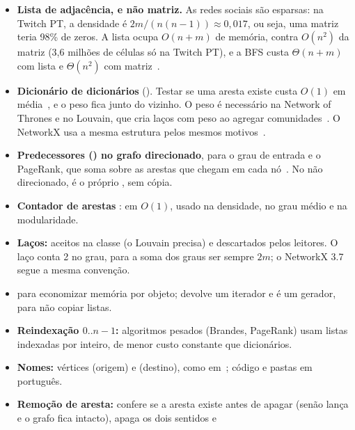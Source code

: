 \begin{itemize}[leftmargin=*]
  \item \textbf{Lista de adjacência, e não matriz.} As redes sociais são esparsas: na Twitch PT,
        a densidade é $2m/(n(n-1)) \approx 0{,}017$, ou seja, uma matriz teria 98\% de zeros.
        A lista ocupa $O(n+m)$ de memória, contra $O(n^2)$ da matriz (3,6 milhões de células só na
        Twitch PT), e a BFS custa $\Theta(n+m)$ com lista e $\Theta(n^2)$ com
        matriz~\cite{cormen2022,sedgewick2011}.
  \item \textbf{Dicionário de dicionários} (). Testar se uma aresta existe
        custa $O(1)$ em média~\cite{pythoncomplexidade}, e o peso fica junto do vizinho. O peso é
        necessário na Network of Thrones e no Louvain, que cria laços com peso ao agregar
        comunidades~\cite{blondel2008}. O NetworkX usa a mesma estrutura pelos mesmos
        motivos~\cite{hagberg2008}.
  \item \textbf{Predecessores () no grafo direcionado}, para o grau de entrada e o
        PageRank, que soma sobre as arestas que chegam em cada nó~\cite{brin1998}. No não
        direcionado,  é o próprio , sem cópia.
  \item \textbf{Contador de arestas} :  em $O(1)$, usado na
        densidade, no grau médio e na modularidade.
  \item \textbf{Laços:} aceitos na classe (o Louvain precisa) e descartados pelos leitores. O laço
        conta 2 no grau, para a soma dos graus ser sempre $2m$; o NetworkX 3.7 segue a mesma convenção.
  \item \textbf{} para economizar memória por objeto;  devolve
        um iterador e  é um gerador, para não copiar listas.
  \item \textbf{Reindexação $0..n-1$:} algoritmos pesados (Brandes, PageRank) usam listas indexadas
        por inteiro, de menor custo constante que dicionários. 
  \item \textbf{Nomes:} vértices  (origem) e  (destino), como em~\cite{sedgewick2011};
        código e pastas em português.
  \item \textbf{Remoção de aresta:}  confere se a aresta existe antes de
        apagar (senão lança  e o grafo fica intacto), apaga os dois sentidos e

\end{itemize}
